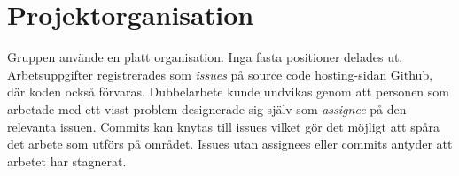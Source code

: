 \section{Projektorganisation}

Gruppen använde en platt organisation. Inga fasta positioner delades ut.
Arbetsuppgifter registrerades som \emph{issues} på source code hosting-sidan Github,
där koden också förvaras. Dubbelarbete kunde undvikas genom att personen som
arbetade med ett visst problem designerade sig själv som \emph{assignee} på den
relevanta issuen. Commits kan knytas till issues vilket gör det möjligt att
spåra det arbete som utförs på området. Issues utan assignees eller commits
antyder att arbetet har stagnerat.
